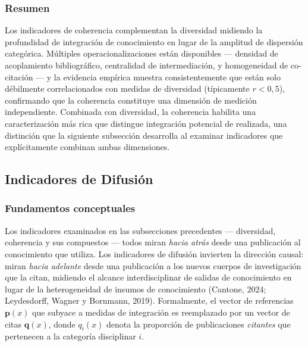 \documentclass[
]{article}
\begin{document}
\hypertarget{resumen-1}{%
\subsubsection{Resumen}\label{resumen-1}}

Los indicadores de coherencia complementan la diversidad midiendo la
profundidad de integración de conocimiento en lugar de la amplitud de
dispersión categórica. Múltiples operacionalizaciones están disponibles
--- densidad de acoplamiento bibliográfico, centralidad de
intermediación, y homogeneidad de co-citación --- y la evidencia
empírica muestra consistentemente que están solo débilmente
correlacionados con medidas de diversidad (típicamente \(r < 0,5\)),
confirmando que la coherencia constituye una dimensión de medición
independiente. Combinada con diversidad, la coherencia habilita una
caracterización más rica que distingue integración potencial de
realizada, una distinción que la siguiente subsección desarrolla al
examinar indicadores que explícitamente combinan ambas dimensiones.

\hypertarget{indicadores-de-difusiuxf3n}{%
\subsection{Indicadores de Difusión}\label{indicadores-de-difusiuxf3n}}

\hypertarget{fundamentos-conceptuales-1}{%
\subsubsection{Fundamentos
conceptuales}\label{fundamentos-conceptuales-1}}

Los indicadores examinados en las subsecciones precedentes ---
diversidad, coherencia y sus compuestos --- todos miran \emph{hacia
atrás} desde una publicación al conocimiento que utiliza. Los
indicadores de difusión invierten la dirección causal: miran \emph{hacia
adelante} desde una publicación a los nuevos cuerpos de investigación
que la citan, midiendo el alcance interdisciplinar de salidas de
conocimiento en lugar de la heterogeneidad de insumos de conocimiento
(Cantone, 2024; Leydesdorff, Wagner y Bornmann, 2019). Formalmente, el
vector de referencias \(\mathbf{p}(x)\) que subyace a medidas de
integración es reemplazado por un vector de citas \(\mathbf{q}(x)\),
donde \(q_i(x)\) denota la proporción de publicaciones \emph{citantes}
que pertenecen a la categoría disciplinar \(i\).
\end{document}

